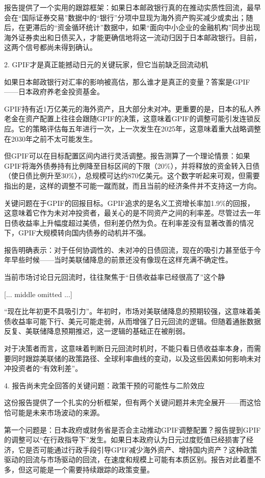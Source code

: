 \documentclass[11pt]{ctexart}
\begin{document}
报告提供了一个实用的跟踪框架：如果日本邮政银行真的在推动实质性回流，最早会在“国际证券交易”数据中的“银行”分项中显现为海外资产购买减少或卖出；随后，在更滞后的“资金循环统计”数据中，如果“面向中小企业的金融机构”同步出现海外证券卖出和日债买入，才能更确信地将这一流动归因于日本邮政银行。目前，这两个信号都尚未得到确认。

2. GPIF才是真正能撼动日元的关键玩家，但它当前缺乏回流动机

如果日本邮政银行对汇率的影响被高估，那么谁才是真正的变量？答案是GPIF——日本政府养老金投资基金。

GPIF持有近1万亿美元的海外资产，且大部分未对冲。更重要的是，日本的私人养老金在资产配置上往往会跟随GPIF的决策，这意味着GPIF的调整可能引发连锁反应。它的策略评估每五年进行一次，上一次发生在2025年，这意味着重大战略调整在2030年之前不太可能发生。

但GPIF可以在目标配置区间内进行灵活调整。报告测算了一个理论情景：如果GPIF将海外债券持有比例降至目标区间的下限（20\%），并将释放的资金转入日债（使日债比例升至30\%），总规模可达约870亿美元。这个数字听起来可观，但需要指出的是，这样的调整不可能一蹴而就，而且当前的经济条件并不支持这一方向。

关键问题在于GPIF的回报目标。GPIF追求的是名义工资增长率加1.9\%的回报，这意味着它作为未对冲投资者，最关心的是不同资产之间的利率差。尽管过去一年日债收益率上升幅度超过美债，但利差仍然为负。在利率差没有显著改善的情况下，GPIF大规模转向国内债券的动机并不强。

报告明确表示：对于任何协调性的、未对冲的日债回流，现在的吸引力甚至低于今年早些时候——当时美联储降息的前景还没有像现在这样充满不确定性。

当前市场讨论日元回流时，往往聚焦于“日债收益率已经很高了”这个静

[... middle omitted ...]

“现在比年初更不具吸引力”。年初时，市场对美联储降息的预期较强，这意味着美债收益率可能下行、美元可能走弱，从而增强了日元回流的逻辑。但随着通胀数据反复、美联储降息预期推迟，这一逻辑的基础正在被削弱。

对于决策者而言，这意味着判断日元回流时机时，不能只看日债收益率本身，而需要同时跟踪美联储的政策路径、全球利率曲线的变动，以及这些因素如何影响未对冲投资者的“有效利差”。

4. 报告尚未完全回答的关键问题：政策干预的可能性与二阶效应

这份报告提供了一个扎实的分析框架，但有两个关键问题并未完全展开——而这恰恰可能是未来市场波动的来源。

第一个问题是：日本政府或财务省是否会主动推动GPIF调整配置？报告提到GPIF的调整可以“在行政指导下”发生。如果日本政府认为日元过度贬值已经损害了经济，它是否可能通过行政手段引导GPIF减少海外资产、增持国内资产？这种政策驱动的回流与市场驱动的回流，在速度和规模上可能有本质区别。报告对此着墨不多，但这可能是一个需要持续跟踪的政策变量。
\end{document}
